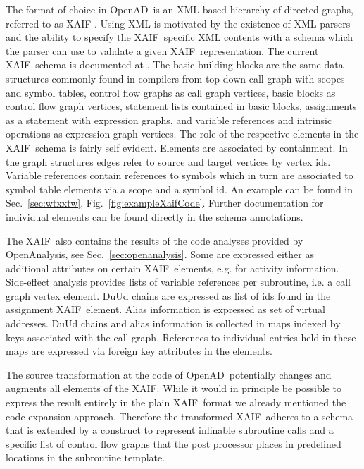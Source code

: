 \documentclass{book}
\newcommand{\OpenAD}{OpenAD}
\newcommand{\OpenAnalysis}{OpenAnalysis}
\newcommand{\xaif}{XAIF}
\newcommand{\refsec}[1]{{Sec.~\ref{#1}}}
\newcommand{\reffig}[1]{{Fig.~\ref{#1}}}
\begin{document}
The format of choice in \OpenAD\ is an XML-based \cite{xmlWeb} hierarchy of 
directed graphs, referred to as \xaif 
\cite{Hovland2002AXB}. Using XML is motivated by the existence of XML parsers and 
the ability to specify the \xaif\ specific XML contents with a schema which 
the parser can use to validate a given \xaif\ representation. 
The current \xaif\ schema is documented at \cite{xaifweb}.
The basic building blocks are the same data structures commonly found 
in compilers from top down call graph with scopes and symbol tables, 
control flow graphs as call graph vertices, basic blocks  as control flow 
graph vertices, statement lists contained in basic blocks, 
assignments as a statement with expression graphs,  and variable references 
and intrinsic operations as expression graph vertices. 
The role of the respective elements in the \xaif\ schema is fairly self evident. 
Elements are associated by containment. In the graph structures edges 
refer to source and target vertices by vertex ids. 
Variable references contain references to symbols which in turn 
are associated to symbol table elements via a scope and a symbol id. 
An example can be found in \refsec{sec:wtxxtw}, \reffig{fig:exampleXaifCode}.
Further documentation for individual elements can be found directly in the 
schema annotations. 

The \xaif\ also contains the results of the code analyses provided 
by \OpenAnalysis, see \refsec{sec:openanalysis}. Some are expressed 
either as additional attributes on certain \xaif\ elements, e.g. for activity information. 
Side-effect analysis provides lists of variable references per subroutine, i.e. a call graph vertex element.
DuUd chains are expressed as list of ids found in the assignment \xaif\ element.
Alias information is expressed as set of virtual addresses. 
DuUd chains and alias information is collected in maps indexed by keys associated with the call 
graph. References to individual entries held in these maps are expressed via foreign key 
attributes in the elements. 

The source transformation at the code of \OpenAD\ potentially changes and augments 
all elements of the \xaif. While it would in principle be possible  
to express the result entirely in the plain \xaif\ format we already mentioned the 
code expansion approach. Therefore the transformed \xaif\ adheres to a schema 
that is extended by a construct to represent inlinable subroutine calls and 
a specific list of control flow graphs that the post processor places in predefined 
locations in the subroutine template.    
\end{document}
